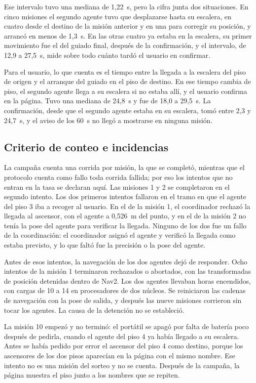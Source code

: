 Ese intervalo tuvo una mediana de 1,22~s, pero la cifra junta dos situaciones. En
cinco misiones el segundo agente tuvo que desplazarse hasta su escalera, en
cuatro desde el destino de la misión anterior y en una para corregir su posición, y arrancó en menos de 1,3~s. En las otras cuatro ya estaba en la
escalera, su primer movimiento fue el del guiado final, después de la
confirmación, y el intervalo, de 12,9 a 27,5~s, mide sobre todo cuánto tardó el
usuario en confirmar.

Para el usuario, lo que cuenta es el tiempo entre la llegada a la escalera del
piso de origen y el arranque del guiado en el piso de destino. En ese tiempo
cambia de piso, el segundo agente llega a su escalera si no estaba allí, y el
usuario confirma en la página. Tuvo una mediana de 24,8~s y fue de 18,0 a
29,5~s. La confirmación, desde que el segundo agente estaba en su escalera, tomó
entre 2,3 y 24,7~s, y el aviso de los 60~s no llegó a mostrarse en ninguna misión.

\subsection{Criterio de conteo e incidencias}

La campaña cuenta una corrida por misión, la que se completó, mientras que el protocolo cuenta como fallo toda corrida fallida; por eso los intentos que no entran en la tasa se declaran aquí. Las misiones 1 y 2 se
completaron en el segundo intento. Los dos primeros intentos fallaron en el tramo
en que el agente del piso 3 iba a recoger al usuario. En el de la misión 1, el
coordinador rechazó la llegada al ascensor, con el agente a 0,526~m del punto, y en el de la misión 2 no tenía la pose del agente para verificar la llegada. Ninguno de los dos fue un fallo de la coordinación: el coordinador asignó el agente y verificó la llegada como estaba previsto, y lo que faltó fue la precisión o la pose del agente.

Antes de esos intentos, la navegación de los dos agentes dejó de responder.
Ocho intentos de la misión 1 terminaron rechazados o abortados, con las
transformadas de posición detenidas dentro de Nav2. Los dos agentes llevaban
horas encendidos, con cargas de 10 a 14 en procesadores de dos núcleos. Se
reiniciaron las cadenas de navegación con la pose de salida, y después las nueve
misiones corrieron sin tocar los agentes. La causa de la detención no se
estableció.

La misión 10 empezó y no terminó: el portátil se apagó por falta de batería poco después de pedirla, cuando el agente del piso 4 ya había llegado a su
escalera. Antes se había pedido por error el ascensor del piso 4 como
destino, porque los ascensores de los dos pisos aparecían en la página con el mismo nombre. Ese intento no es una misión del sorteo y no se cuenta. Después de
la campaña, la página muestra el piso junto a los nombres que se repiten.

